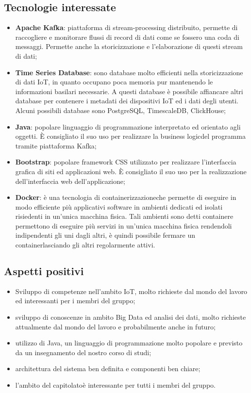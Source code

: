 \subsection{Tecnologie interessate}
\begin{itemize}
	\item \textbf{Apache Kafka}: piattaforma di stream-processing distribuito, permette di raccogliere e monitorare flussi di record di dati come se fossero una coda di messaggi. Permette anche la storicizzazione e l'elaborazione di questi stream di dati;
	\item \textbf{Time Series Database}: sono database molto efficienti nella storicizzazione di dati IoT, in quanto occupano poca memoria pur mantenendo le informazioni basilari necessarie. A questi database è possibile affiancare altri database per contenere i metadati dei dispositivi IoT ed i dati degli utenti. Alcuni possibili database sono PostgreSQL, TimescaleDB, ClickHouse;
	\item \textbf{Java}: popolare linguaggio di programmazione interpretato ed orientato agli oggetti. È consigliato il suo uso per realizzare la business logic\glosp del programma tramite piattaforma Kafka;
	\item \textbf{Bootstrap}: popolare framework CSS utilizzato per realizzare l'interfaccia grafica di siti ed applicazioni web. È consigliato il suo uso per la realizzazione dell'interfaccia web dell'applicazione;
	\item \textbf{Docker}: è una tecnologia di containerizzazione\glosp che permette di eseguire in modo efficiente più applicativi software in ambienti dedicati ed isolati risiedenti in un'unica macchina fisica. Tali ambienti sono detti container\glosp e permettono di eseguire più servizi in un'unica macchina fisica rendendoli indipendenti gli uni dagli altri, è quindi possibile fermare un container\glosp lasciando gli altri regolarmente attivi.
\end{itemize} 
\subsection{Aspetti positivi}
\begin{itemize} 
	\item Sviluppo di competenze nell'ambito IoT, molto richieste dal mondo del lavoro ed interessanti per i membri del gruppo;
	\item sviluppo di conoscenze in ambito Big Data ed analisi dei dati, molto richieste attualmente dal mondo del lavoro e probabilmente anche in futuro;
	\item utilizzo di Java, un linguaggio di programmazione molto popolare e previsto da un insegnamento del nostro corso di studi;
	\item architettura del sistema ben definita e componenti ben chiare;
	\item l'ambito del capitolato\glosp è interessante per tutti i membri del gruppo.
\end{itemize}
